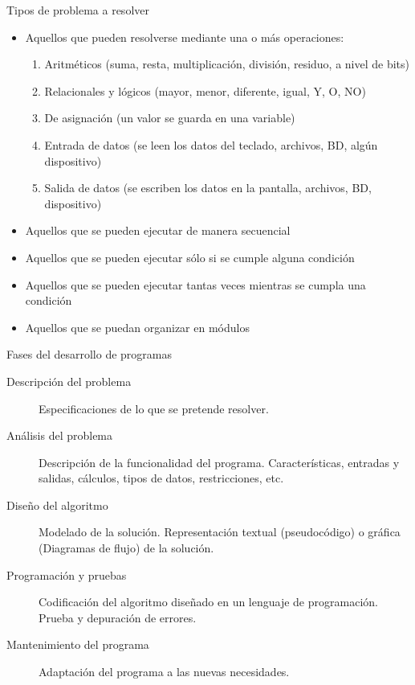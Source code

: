 \begin{frame}[c]{Tipos de problema a resolver}
  \pausa
  \begin{itemize}
    \item Aquellos que pueden resolverse mediante una o más operaciones:
      \begin{enumerate}
        \item Aritméticos (suma, resta, multiplicación, división, residuo,
          a nivel de bits)
        \pausa
        \item Relacionales y lógicos (mayor, menor, diferente, igual, Y, O, NO)
        \pausa
        \item De asignación (un valor se guarda en una variable)
        \pausa
        \item Entrada de datos (se leen los datos del teclado, archivos, BD,
          algún dispositivo)
        \pausa
        \item Salida de datos (se escriben los datos en la pantalla, archivos,
          BD, dispositivo)
      \end{enumerate}
    \pausa
    \item Aquellos que se pueden ejecutar de manera secuencial
    \pausa
    \item Aquellos que se pueden ejecutar sólo si se cumple alguna condición
    \pausa
    \item Aquellos que se pueden ejecutar tantas veces mientras se cumpla una
      condición
    \pausa
    \item Aquellos que se puedan organizar en módulos
  \end{itemize}
\end{frame}

\begin{frame}[c]{Fases del desarrollo de programas}
  \begin{description}
    \item[Descripción del problema] Especificaciones de lo que se pretende
      resolver.
    \pausa
    \item[Análisis del problema] Descripción de la funcionalidad del programa.
      Características, entradas y salidas, cálculos, tipos de datos,
      restricciones, etc.
    \pausa
    \item[Diseño del algoritmo] Modelado de la solución. Representación
      textual (pseudocódigo) o gráfica (Diagramas de flujo) de la solución.
    \pausa
    \item[Programación y pruebas] Codificación del algoritmo diseñado en un
      lenguaje de programación. Prueba y depuración de errores.
    \pausa
    \item[Mantenimiento del programa] Adaptación del programa a las nuevas
      necesidades.
  \end{description}
\end{frame}

